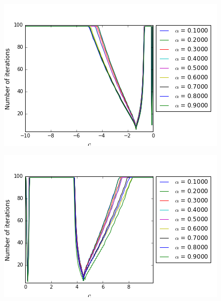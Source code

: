 \begingroup
\begin{minipage}{.5\linewidth}
\begin{center}
	\includegraphics[scale=.4]{figures/FinalFigures/NiterxCoefVarInterfaceFinalVersionN.png}
\end{center}
\end{minipage}
\begin{minipage}{.5\linewidth}
\begin{center}
	\includegraphics[scale=.4]{figures/FinalFigures/NiterxCoefVarinterfaceFinalVersionP.png}
\end{center}
\end{minipage}
